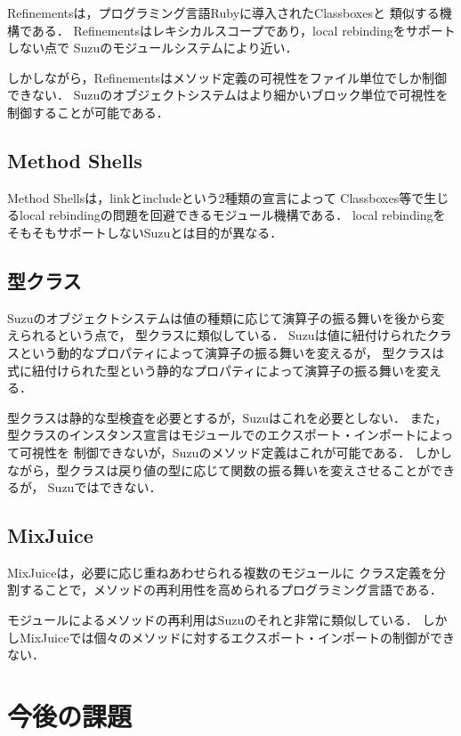 \documentclass{ipsjprosym}
\begin{document}
Refinements\cite{Maeda:2013}は，プログラミング言語Rubyに導入されたClassboxesと
類似する機構である．
Refinementsはレキシカルスコープであり，local rebindingをサポートしない点で
Suzuのモジュールシステムにより近い．

しかしながら，Refinementsはメソッド定義の可視性をファイル単位でしか制御できない．
Suzuのオブジェクトシステムはより細かいブロック単位で可視性を制御することが可能である．

\subsection{Method Shells}

Method Shells\cite{Takeshita:2014-07-14}は，linkとincludeという2種類の宣言によって
Classboxes等で生じるlocal rebindingの問題を回避できるモジュール機構である．
local rebindingをそもそもサポートしないSuzuとは目的が異なる．

\subsection{型クラス}

Suzuのオブジェクトシステムは値の種類に応じて演算子の振る舞いを後から変えられるという点で，
型クラス\cite{Wadler:1989:MAP:75277.75283}に類似している．
Suzuは値に紐付けられたクラスという動的なプロパティによって演算子の振る舞いを変えるが，
型クラスは式に紐付けられた型という静的なプロパティによって演算子の振る舞いを変える．

型クラスは静的な型検査を必要とするが，Suzuはこれを必要としない．
また，型クラスのインスタンス宣言はモジュールでのエクスポート・インポートによって可視性を
制御できないが，Suzuのメソッド定義はこれが可能である．
しかしながら，型クラスは戻り値の型に応じて関数の振る舞いを変えさせることができるが，
Suzuではできない．

\subsection{MixJuice}

MixJuice\cite{Ichisugi:2002}は，必要に応じ重ねあわせられる複数のモジュールに
クラス定義を分割することで，メソッドの再利用性を高められるプログラミング言語である．

モジュールによるメソッドの再利用はSuzuのそれと非常に類似している．
しかしMixJuiceでは個々のメソッドに対するエクスポート・インポートの制御ができない．

\section{今後の課題}
\end{document}
